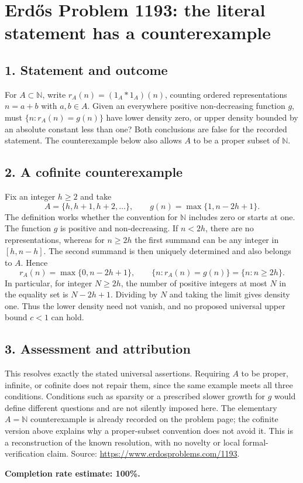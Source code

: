 \section*{Erd\H{o}s Problem 1193: the literal statement has a counterexample}
\subsection*{1. Statement and outcome}
For $A\subset\mathbb N$, write $r_A(n)=(1_A*1_A)(n)$, counting ordered representations $n=a+b$ with $a,b\in A$. Given an everywhere positive non-decreasing function $g$, must $\{n:r_A(n)=g(n)\}$ have lower density zero, or upper density bounded by an absolute constant less than one? Both conclusions are false for the recorded statement. The counterexample below also allows $A$ to be a proper subset of $\mathbb N$.

\subsection*{2. A cofinite counterexample}
Fix an integer $h\ge2$ and take
\[
 A=\{h,h+1,h+2,\ldots\},\qquad g(n)=\max\{1,n-2h+1\}.
\]
The definition works whether the convention for $\mathbb N$ includes zero or starts at one. The function $g$ is positive and non-decreasing. If $n<2h$, there are no representations, whereas for $n\ge2h$ the first summand can be any integer in $[h,n-h]$. The second summand is then uniquely determined and also belongs to $A$. Hence
\[
 r_A(n)=\max\{0,n-2h+1\},\qquad
 \{n:r_A(n)=g(n)\}=\{n:n\ge2h\}.
\]
In particular, for integer $N\ge2h$, the number of positive integers at most $N$ in the equality set is $N-2h+1$. Dividing by $N$ and taking the limit gives density one. Thus the lower density need not vanish, and no proposed universal upper bound $c<1$ can hold.

\subsection*{3. Assessment and attribution}
This resolves exactly the stated universal assertions. Requiring $A$ to be proper, infinite, or cofinite does not repair them, since the same example meets all three conditions. Conditions such as sparsity or a prescribed slower growth for $g$ would define different questions and are not silently imposed here. The elementary $A=\mathbb N$ counterexample is already recorded on the problem page; the cofinite version above explains why a proper-subset convention does not avoid it. This is a reconstruction of the known resolution, with no novelty or local formal-verification claim.
Source: \url{https://www.erdosproblems.com/1193}.

\textbf{Completion rate estimate: 100\%.}
